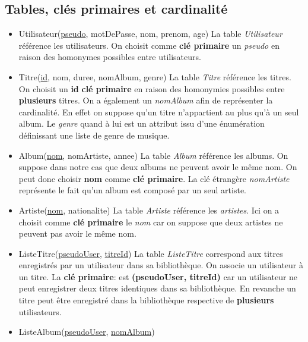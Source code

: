 \documentclass[a4paper,12pt, french]{report}
\begin{document}
  \subsection{Tables, clés primaires et cardinalité}
    \begin{itemize}
      \item Utilisateur(\underline{pseudo}, motDePasse, nom, prenom, age) \newline
        La table \emph{Utilisateur} référence les utilisateurs. On choisit comme \textbf{clé primaire} un \emph{pseudo} en raison des homonymes possibles entre utilisateurs.
      \item Titre(\underline{id}, nom, duree, nomAlbum, genre) \newline
        La table \emph{Titre} référence les titres. On choisit un \textbf{id} \textbf{clé primaire} en raison des homonymies possibles entre \textbf{plusieurs} titres. On a également un \emph{nomAlbum} afin de représenter la cardinalité. En effet on suppose qu'un titre n'appartient au plus qu'à un seul album. Le \emph{genre} quand à lui est un attribut issu d'une énumération définissant une liste de genre de musique.
       \item Album(\underline{nom}, nomArtiste, annee) \newline
        La table \emph{Album} référence les albums. On suppose dans notre cas que deux albums ne peuvent avoir le même nom. On peut donc choisir \textbf{nom} comme \textbf{clé primaire}. La clé étrangère \emph{nomArtiste} représente le fait qu'un album est composé par un seul artiste.
      \item Artiste(\underline{nom}, nationalite) \newline
        La table \emph{Artiste} référence les \emph{artistes}. Ici on a choisit comme \textbf{clé primaire} le \emph{nom} car on suppose que deux artistes ne peuvent pas avoir le même nom.
      \item ListeTitre(\underline{pseudoUser}, \underline{titreId}) \newline
        La table \emph{ListeTitre} correspond aux titres enregistrés par un utilisateur dans sa bibliothèque. On associe un utilisateur à un titre. La \textbf{clé primaire}: est \textbf{(pseudoUser, titreId)} car un utilisateur ne peut enregistrer deux titres identiques dans sa bibliothèque. En revanche un titre peut être enregistré dans la bibliothèque respective de \textbf{plusieurs} utilisateurs.
      \item ListeAlbum(\underline{pseudoUser}, \underline{nomAlbum}) \newline

\end{itemize}
\end{document}
